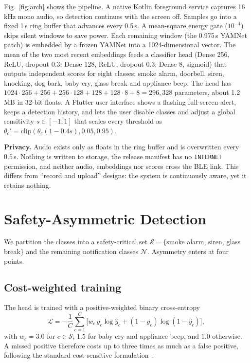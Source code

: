 \documentclass[conference]{IEEEtran}
\begin{document}
Fig.~\ref{fig:arch} shows the pipeline. A native Kotlin foreground service captures 16\,kHz mono audio, so detection continues with the screen off. Samples go into a fixed 1\,s ring buffer that advances every 0.5\,s. A mean-square energy gate ($10^{-4}$) skips silent windows to save power. Each remaining window (the 0.975\,s YAMNet patch) is embedded by a frozen YAMNet into a 1024-dimensional vector. The mean of the two most recent embeddings feeds a classifier head (Dense 256, ReLU, dropout 0.3; Dense 128, ReLU, dropout 0.3; Dense 8, sigmoid) that outputs independent scores for eight classes: smoke alarm, doorbell, siren, knocking, dog bark, baby cry, glass break and appliance beep. The head has $1024{\cdot}256{+}256{+}256{\cdot}128{+}128{+}128{\cdot}8{+}8 = 296{,}328$ parameters, about 1.2\,MB in 32-bit floats. A Flutter user interface shows a flashing full-screen alert, keeps a detection history, and lets the user disable classes and adjust a global sensitivity $s\in[-1,1]$ that scales every threshold as $\theta_c' = \mathrm{clip}(\theta_c(1-0.4s), 0.05, 0.95)$.

\textbf{Privacy.} Audio exists only as floats in the ring buffer and is overwritten every 0.5\,s. Nothing is written to storage, the release manifest has no \texttt{INTERNET} permission, and neither audio, embeddings nor scores cross the BLE link. This differs from ``record and upload'' designs: the system is continuously aware, yet it retains nothing.

\section{Safety-Asymmetric Detection}\label{sec:asym}
We partition the classes into a safety-critical set $\mathcal{S}=\{$smoke alarm, siren, glass break$\}$ and the remaining notification classes $\mathcal{N}$. Asymmetry enters at four points.

\subsection{Cost-weighted training}
The head is trained with a positive-weighted binary cross-entropy
\begin{equation}
\mathcal{L} = -\frac{1}{C}\sum_{c=1}^{C}\Big[w_c\,y_c\log\hat{y}_c + (1-y_c)\log(1-\hat{y}_c)\Big],
\end{equation}
with $w_c=3.0$ for $c\in\mathcal{S}$, $1.5$ for baby cry and appliance beep, and $1.0$ otherwise. A missed positive therefore costs up to three times as much as a false positive, following the standard cost-sensitive formulation~\cite{elkan2001}.
\end{document}
